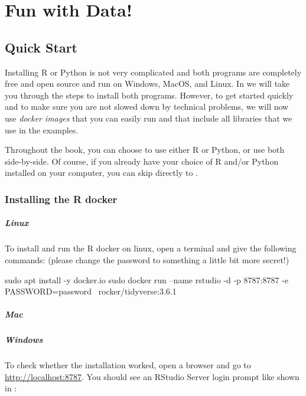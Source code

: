 \chapter{Fun with Data!}
\label{chap:fundata}

\section{Quick Start}

Installing R or Python is not very complicated and both programs are completely free and open source and run on Windows, MacOS, and Linux.
In  we will take you through the steps to install both programs.
However, to get started quickly and to make sure you are not slowed down by technical problems,
we will now use \emph{docker images} that you can easily run and that include all libraries that we use in the examples.

Throughout the book, you can choose to use either R or Python, or use both side-by-side.
Of course, if you already have your choice of R and/or Python installed on your computer, you can skip directly to . 

\subsection{Installing the R docker}

\paragraph{Linux} To install and run the R docker on linux, open a terminal and give the following commands:
(please change the password to something a little bit more secret!)

\begin{terminal}
sudo apt install -y docker.io
sudo docker run --name rstudio -d -p 8787:8787 -e PASSWORD=password \
     rocker/tidyverse:3.6.1
\end{terminal}


\paragraph{Mac}

\paragraph{Windows} 

To check whether the installation worked, open a browser and go to \url{http://localhost:8787}.
You should see an RStudio Server login prompt like shown in \reffig{fun.rstudio.signin}:

